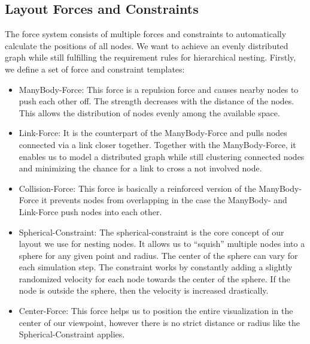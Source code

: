\subsection{Layout Forces and Constraints}
\label{chap:ps-forces}
The force system consists of multiple forces and constraints to automatically calculate the positions of all nodes. We want to achieve an evenly distributed graph while still fulfilling the requirement rules for hierarchical nesting. Firstly, we define a set of force and constraint templates:
\begin{itemize}
    \item ManyBody-Force: This force is a repulsion force and causes nearby nodes to push each other off. The strength decreases with the distance of the nodes. This allows the distribution of nodes evenly among the available space.
    \item Link-Force: It is the counterpart of the ManyBody-Force and pulls nodes connected via a link closer together. Together with the ManyBody-Force, it enables us to model a distributed graph while still clustering connected nodes and minimizing the chance for a link to cross a not involved node.
    \item Collision-Force: This force is basically a reinforced version of the ManyBody-Force it prevents nodes from overlapping in the case the ManyBody- and Link-Force push nodes into each other.
    \item Spherical-Constraint: The spherical-constraint is the core concept of our layout we use for nesting nodes. It allows us to “squish” multiple nodes into a sphere for any given point and radius. The center of the sphere can vary for each simulation step. The constraint works by constantly adding a slightly randomized velocity for each node towards the center of the sphere. If the node is outside the sphere, then the velocity is increased drastically.
    \item Center-Force: This force helps us to position the entire visualization in the center of our viewpoint, however there is no strict distance or radius like the Spherical-Constraint applies.
\end{itemize}

